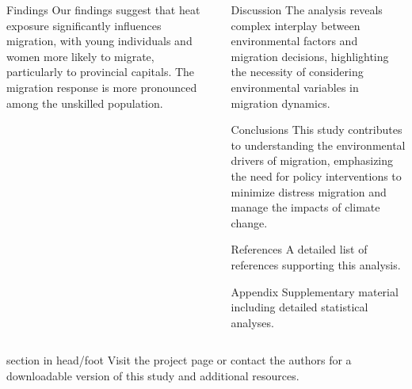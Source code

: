 \documentclass[final]{beamer}
\begin{document}
\begin{frame}[t]
\begin{columns}[T]
\begin{column}{.32\textwidth}
    \begin{block}{\Huge Findings}
    \Large
    Our findings suggest that heat exposure significantly influences migration, with young individuals and women more likely to migrate, particularly to provincial capitals. The migration response is more pronounced among the unskilled population.
    \end{block}
\end{column}

\begin{column}{.32\textwidth}
    \begin{block}{\Huge Discussion}
    \Large
    The analysis reveals complex interplay between environmental factors and migration decisions, highlighting the necessity of considering environmental variables in migration dynamics.
    \end{block}

    \vspace{1cm}

    \begin{block}{\Huge Conclusions}
    \Large
    This study contributes to understanding the environmental drivers of migration, emphasizing the need for policy interventions to minimize distress migration and manage the impacts of climate change.
    \end{block}

    \vspace{1cm}

    \begin{block}{\Huge References}
    \Large
    A detailed list of references supporting this analysis.
    \end{block}

    \vspace{1cm}

    \begin{block}{\Huge Appendix}
    \Large
    Supplementary material including detailed statistical analyses.
    \end{block}
\end{column}

\end{columns}
\vspace{1cm}

\begin{beamercolorbox}[center]{section in head/foot}
\Large Visit the project page or contact the authors for a downloadable version of this study and additional resources.
\end{beamercolorbox}

\end{frame}
\end{document}
